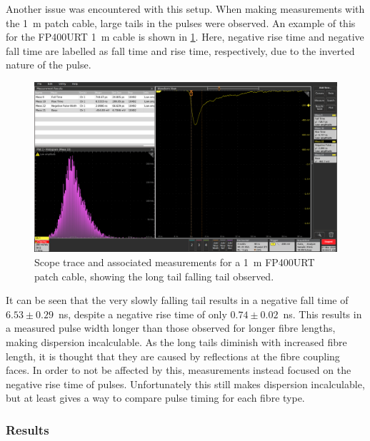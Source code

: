 \documentclass[a4paper,11pt]{article}
\begin{document}
Another issue was encountered with this setup. When making measurements with the 1~m patch cable, large tails in the pulses were observed. An example of this for the FP400URT 1~m cable is shown in \cref{fig:fp400urt1m}. Here, negative rise time and negative fall time are labelled as fall time and rise time, respectively, due to the inverted nature of the pulse.
\begin{figure}[h]
\centering
\includegraphics[width=\textwidth]{FP400URT_1m_1.png}
\caption{Scope trace and associated measurements for a 1~m FP400URT patch cable, showing the long tail falling tail observed.}\label{fig:fp400urt1m}
\end{figure}
It can be seen that the very slowly falling tail results in a negative fall time of $6.53\pm0.29$~ns, despite a negative rise time of only $0.74\pm0.02$~ns. This results in a measured pulse width longer than those observed for longer fibre lengths, making dispersion incalculable. As the long tails diminish with increased fibre length, it is thought that they are caused by reflections at the fibre coupling faces. In order to not be affected by this, measurements instead focused on the negative rise time of pulses. Unfortunately this still makes dispersion incalculable, but at least gives a way to compare pulse timing for each fibre type.

\subsubsection{Results}\label{sec:fibre:sub:disp:sub:method}
\end{document}
